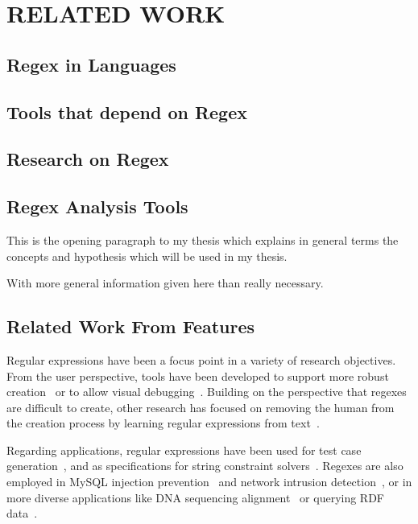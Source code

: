 \chapter{RELATED WORK}

\section{Regex in Languages}

\section{Tools that depend on Regex}

\section{Research on Regex}

\section{Regex Analysis Tools}

This is the opening paragraph to my thesis which
explains in general terms the concepts and hypothesis
which will be used in my thesis.

With more general information given here than really
necessary.

\section{Related Work From Features}
\label{sec:related}
Regular expressions have been a focus point in a variety of research objectives. From the user perspective, tools have been developed to support more robust creation~\cite{Spishak:2012:TSR:2318202.2318207} or to allow visual debugging~\cite{Beck:2014:RVD:2591062.2591111}.
Building on the perspective that regexes are difficult to create, other research has focused on removing the human from the creation process by learning regular expressions from  text~\cite{Babbar:2010:CBA:1871840.1871848, Li:2008:REL:1613715.1613719}.

Regarding applications, regular expressions have been used for test case generation~\cite{Ghosh:2013:JAT:2486788.2486925, Galler:2014:STD:2683035.2683100, Anand:2013:OSM:2503903.2503991, Tillmann:2014:TAT:2642937.2642941},  and
as specifications for string constraint solvers~\cite{Trinh:2014:SSS:2660267.2660372, hampi}.
Regexes are also employed in MySQL injection prevention~\cite{Yeole:2011:ADT:1980022.1980229} and network intrusion detection~\cite{network}, or in more diverse applications like DNA sequencing alignment~\cite{1594922} or querying RDF data~\cite{Lee:2010:PSQ:1871871.1871877, Alkhateeb:2009:ESR:1540656.1540975}.

